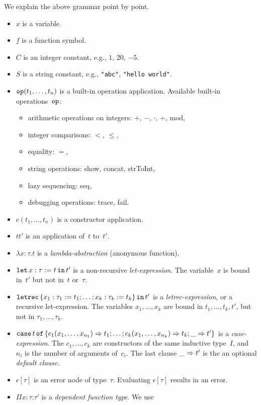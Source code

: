 \documentclass[
    9pt,            %
    techreport,        %
    affiltop,       %
]{art}
\begin{document}
We explain the above grammar point by point.
\begin{itemize}
\item $x$ is a variable.
\item $f$ is a function symbol.
\item $C$ is an integer constant, e.g., $1$, $20$, $-5$.
\item $S$ is a string constant, e.g., \verb|"abc"|, \verb|"hello world"|.
\item $\mathtt{op}(t_1,\ldots,t_n)$ is a built-in operation application. Available
built-in operations~$\mathtt{op}$:
    \begin{itemize}
    \item arithmetic operations on integers: $+$, $-$, $\cdot$, $\div$,
    $\mathrm{mod}$,
    \item integer comparisons: $<$, $\le$,
    \item equality: $=$,
    \item string operations: show, concat, strToInt,
    \item lazy sequencing: seq,
    \item debugging operations: trace, fail.
    \end{itemize}
\item $c(t_1,\ldots,t_n)$ is a constructor application.
\item $t t'$ is an application of~$t$ to~$t'$.
\item $\lambda x : \tau . t$ is a \emph{lambda-abstraction} (anonymous
function).
\item $\mathtt{let}\,x : \tau := t\,\mathtt{in}\,t'$ is a non-recursive \emph{let-expression}.
The variable~$x$ is bound in~$t'$ but not in~$t$ or~$\tau$.
\item $\mathtt{letrec}\,\{x_1 : \tau_1 := t_1; \ldots; x_k : \tau_k := t_k\}\,\mathtt{in}\,t'$
is a \emph{letrec-expression}, or a recursive let-expression. The variables
$x_1,\ldots,x_k$ are bound in $t_1,\ldots,t_k,t'$, but not in
$\tau_1,\ldots,\tau_k$.
\item $\mathtt{case}\,t\,\mathtt{of}\,\{c_1(x_1,\ldots,x_{n_1}) \Rightarrow t_1; \ldots;
c_k(x_1,\ldots,x_{n_k}) \Rightarrow t_k; \_ \Rightarrow t'\}$ is a \emph{case-expression}.
The $c_1,\ldots,c_k$ are constructors of the same inductive type~$I$,
and~$n_i$ is the number of arguments of~$c_i$. The last clause $\_ \Rightarrow t'$
is the an optional \emph{default clause}.
\item $\epsilon[\tau]$ is an error node of type~$\tau$. Evaluating
$\epsilon[\tau]$ results in an error.
\item $\Pi x : \tau . \tau'$ is a \emph{dependent function type}. We use

\end{itemize}
\end{document}
